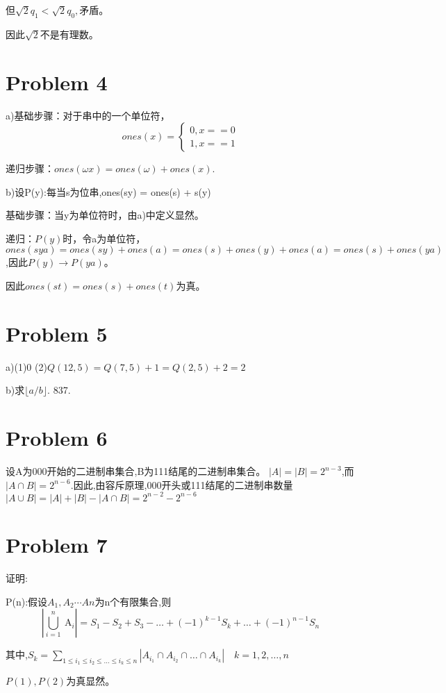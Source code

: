 \documentclass{article}
\begin{document}
但$\sqrt{2}q_1<\sqrt{2}q_0,$矛盾。

因此$\sqrt{2}$不是有理数。
\section*{Problem 4}
a)基础步骤：对于串中的一个单位符，
\begin{equation}
    \nonumber
ones(x)=\left\{\begin{array}{l}
    0,x==0 \\
    1,x==1
    \end{array}\right.
\end{equation}

递归步骤：$ones(\omega x)=ones(\omega)+ones(x)$.

b)设P(y):每当s为位串,ones(sy) = ones(s) + s(y)

基础步骤：当y为单位符时，由a)中定义显然。

递归：$P(y)$时，令a为单位符，$ones(sya)=ones(sy)+ones(a)=ones(s)+ones(y)+ones(a)=ones(s)+ones(ya)$,因此$P(y)\rightarrow P(ya)$。

因此$ones(st)=ones(s)+ones(t)$为真。
\section*{Problem 5}
a)(1)0   (2)$Q(12,5) = Q(7,5)+1 = Q(2,5)+2 = 2$

b)求$\lfloor  a/b\rfloor $. 837.

\section*{Problem 6}
设A为000开始的二进制串集合,B为111结尾的二进制串集合。
$|A|=|B|= 2^{n-3}$,而$|A\cap B| = 2^{n-6}$.因此,由容斥原理,000开头或111结尾的二进制串数量$|A\cup B|=|A|+|B|-|A\cap B| = 2^{n-2}-2^{n-6}$

\section*{Problem 7}
证明:

P(n):假设$A_{1},A_{2}\cdots A{n}$为n个有限集合,则$$\left|\bigcup_{i=1}^{n} \mathrm{~A}_{i}\right| = S_{1}-S_{2}+S_{3}-\ldots+(-1)^{k-1} S_{k}+\ldots+(-1)^{n-1} S_{n}$$

其中,$S_{k}=\sum_{1 \leq i_{1} \leq i_{2} \leq \ldots \leq i_{k} \leq n}\left|A_{i_{1}} \cap A_{i_{2}} \cap \ldots \cap A_{i_{k}}\right| \quad k=1,2, \ldots, n$

$P(1),P(2)$为真显然。
\end{document}
